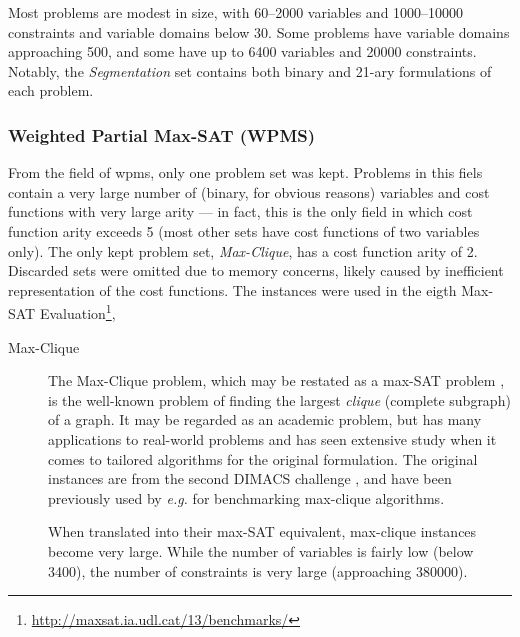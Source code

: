 Most problems are modest in size, with \numrange{60}{2000} variables and \numrange{1000}{10000} constraints and variable domains below \num{30}. 
Some problems have variable domains approaching \num{500}, and some have up to \num{6400} variables and \num{20000} constraints.
Notably, the \emph{Segmentation} set contains both binary and 21-ary formulations of each problem.


\subsubsection{Weighted Partial Max-SAT (WPMS)}
From the field of \gls{wpms}, only one problem set was kept.
Problems in this fiels contain a very large number of (binary, for obvious reasons) variables and cost functions with very large arity --- in fact, this is the only field in which cost function arity exceeds \num{5} (most other sets have cost functions of two variables only).
The only kept problem set, \emph{Max-Clique}, has a cost function arity of \num{2}.
Discarded sets were omitted due to memory concerns, likely caused by inefficient representation of the cost functions.
The instances were used in the eigth Max-SAT Evaluation\footnote{\url{http://maxsat.ia.udl.cat/13/benchmarks/}},

\begin{description}
	\item[Max-Clique]
		The Max-Clique problem, which may be restated as a max-SAT problem \parencite{Heras08}, is the well-known problem of finding the largest \emph{clique} (complete subgraph) of a graph.
		It may be regarded as an academic problem, but has many applications to real-world problems and has seen extensive study when it comes to tailored algorithms for the original formulation.
		The original instances are from the second DIMACS challenge \parencite{Johnson96}, and have been previously used by \emph{e.g.} \textcite{Östergård02} for benchmarking max-clique algorithms.

		When translated into their max-SAT equivalent, max-clique instances become very large. While the number of variables is fairly low (below \num{3400}), the number of constraints is very large (approaching \num{380000}).
\end{description}

